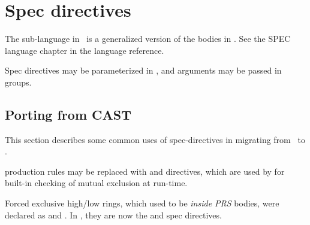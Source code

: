
\section{Spec directives}
\label{sec:spec}

The  sub-language in \hac\ is a generalized version
of the  bodies in \CAST.  
See the SPEC language chapter in the  language reference.  

Spec directives may be parameterized in \hac, 
and arguments may be passed in groups. 

\subsection{Porting from CAST}
\label{sec:spec:porting}

This section describes some common uses of spec-directives
in migrating from \CAST\ to \hac.  

 production rules may be replaced 
with  and  directives, 
which are used by  for built-in checking
of mutual exclusion at run-time.  

Forced exclusive high/low rings, 
which used to be \emph{inside PRS} bodies, 
were declared as  and .  
In \hac, they are now the  and  
spec directives.  

